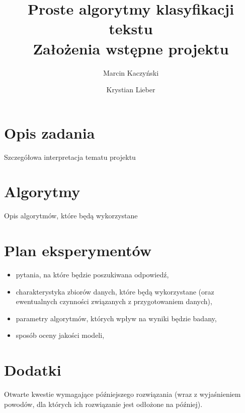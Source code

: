 \documentclass[a4paper,12pt]{article}
\title{Proste algorytmy klasyfikacji tekstu \\ Założenia wstępne projektu}
\author{Marcin Kaczyński \and Krystian Lieber}
\begin{document}
\maketitle

\section{Opis zadania} 

Szczegółowa interpretacja tematu projektu

\section{Algorytmy}

Opis algorytmów, które będą wykorzystane

\section{Plan eksperymentów}

\begin{itemize}
	\item pytania, na które będzie poszukiwana odpowiedź,
	\item charakterystyka zbiorów danych, które będą wykorzystane (oraz ewentualnych czynności związanych z przygotowaniem danych),
	\item parametry algorytmów, których wpływ na wyniki będzie badany,
	\item sposób oceny jakości modeli,
\end{itemize}

\section{Dodatki}

Otwarte kwestie wymagające późniejszego rozwiązania (wraz z wyjaśnieniem powodów, dla których ich rozwiązanie jest odłożone na później).
\end{document}
